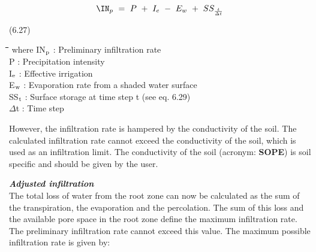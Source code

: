 \documentclass[11pt]{article}
\begin{document}
\begin{displaymath}
\IN _{p} ~=~P~+~I _{e} ~-~ E _{w~} +~ SS _{\frac{t}{\Delta t}} 
\end{displaymath}

 \bigskip
\strut\hfill (6.27)

\nwln
\begin{tabbing}
\hspace{1.27cm}\=\hspace{1.27cm}\=\hspace{1.27cm}\=\hspace{1.27cm}\=%
\hspace{1.27cm}\=\hspace{1.27cm}\=\hspace{1.27cm}\=\hspace{1.27cm}\=%
\hspace{1.27cm}\=\hspace{1.27cm}\=\kill
where\> IN$_{{\rm p}}$\> : Preliminary infiltration rate\> \> \> \> \> \> \> \> [cm d$^{{\rm -1}}$]\\
\>P\> : Precipitation intensity\> \> \> \> \> \> \> \> [cm d$^{{\rm -1}}$]\\
\>I$_{{\rm e}}$\> : Effective irrigation\> \> \> \> \> \> \> \> [cm d$^{{\rm -1}}$]\\
\>E$_{{\rm w}}$\> : Evaporation rate from a shaded water surface\> \> \> \> \> \> \> \> [cm d$^{{\rm -1}}$]\\
\>SS$_{{\rm t}}$\> : Surface storage at time step t (see eq. 6.29)\> \> \> \> \> \> \> \> [cm]\\
\>$\Delta$t\> : Time step\> \> \> \> \> \> \> \> [d]
\end{tabbing}

 \bigskip
However, the infiltration rate is hampered by the conductivity of the soil. The calculated
infiltration rate cannot exceed the conductivity of the soil, which is used as an infiltration
limit. The conductivity of the soil (acronym: {\bf SOPE}) is soil specific and should be given
by the user.

\bigskip
\bigskip
{\bf {\it Adjusted infiltration\/}}\\
The total loss of water from the root zone can now be calculated as the sum of the
{\nobreak}transpiration, the evaporation and the perco\-lation. The sum of this loss and the available
pore space in the root zone define the maximum infiltra\-tion rate. The preliminary
infiltration rate cannot exceed this value. The maximum possible infiltration rate is given
by:
\end{document}
